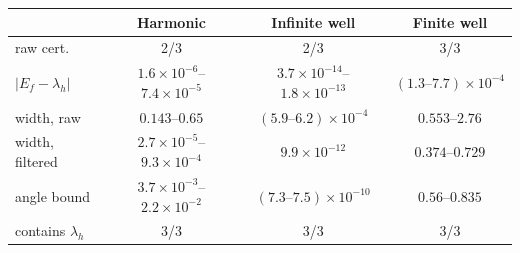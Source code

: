 \setlength{\tabcolsep}{2pt}
\begin{tabular}{lccc}
\toprule
 & Harmonic & Infinite well & Finite well \\
\midrule
raw cert. & 2/3 & 2/3 & 3/3 \\
$|E_f-\lambda_h|$ & $1.6\times10^{-6}$--$7.4\times10^{-5}$ & $3.7\times10^{-14}$--$1.8\times10^{-13}$ & $(1.3\text{--}7.7)\times10^{-4}$ \\
width, raw & $0.143$--$0.65$ & $(5.9\text{--}6.2)\times10^{-4}$ & $0.553$--$2.76$ \\
width, filtered & $2.7\times10^{-5}$--$9.3\times10^{-4}$ & $9.9\times10^{-12}$ & $0.374$--$0.729$ \\
angle bound & $3.7\times10^{-3}$--$2.2\times10^{-2}$ & $(7.3\text{--}7.5)\times10^{-10}$ & $0.56$--$0.835$ \\
contains $\lambda_h$ & 3/3 & 3/3 & 3/3 \\
\bottomrule
\end{tabular}
